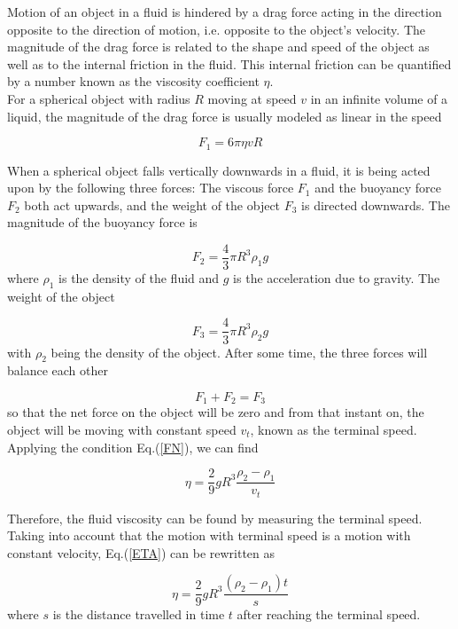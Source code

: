 \documentclass{article}
\begin{document}
Motion of an object in a fluid is hindered by a drag force acting in the direction opposite to the direction of motion, i.e. opposite to the object’s velocity. The magnitude of the drag force is related to the shape and speed of the object as well as to the internal friction in the fluid. This internal friction can be quantified by a number known as the viscosity coefficient $\eta$.
\\

For a spherical object with radius $R$ moving at speed $v$ in an infinite volume of a liquid, the magnitude of the drag force is usually modeled as linear in the speed

\begin{equation}\label{F1}
F_1=6\pi\eta vR
\end{equation}

When a spherical object falls vertically downwards in a fluid, it is being acted upon by the following three forces: The viscous force $F_1$ and the buoyancy force $F_2$ both act upwards, and the weight of the object $F_3$ is directed downwards. The magnitude of the buoyancy force is

$$F_2=\frac{4}{3}\pi R^3\rho_1g$$
where $\rho_1$ is the density of the fluid and $g$ is the acceleration due to gravity. The weight of the object

$$F_3=\frac{4}{3}\pi R^3\rho_2g$$
with $\rho_2$ being the density of the object. After some time, the three forces will balance each other

\begin{equation}\label{FN}
F_1+F_2=F_3
\end{equation}
so that the net force on the object will be zero and from that instant on, the object will be moving with constant speed $v_t$, known as the terminal speed. Applying the condition Eq.(\ref{FN}), we can find

\begin{equation}\label{ETA}
\eta=\frac{2}{9}gR^3\frac{\rho_2-\rho_1}{v_t}
\end{equation}

Therefore, the fluid viscosity can be found by measuring the terminal speed. Taking into account that the motion with terminal speed is a motion with constant velocity, Eq.(\ref{ETA}) can be rewritten as

\begin{equation}\label{ETA2}
\eta=\frac{2}{9}gR^3\frac{(\rho_2-\rho_1)t}{s}
\end{equation}
where $s$ is the distance travelled in time $t$ after reaching the terminal speed.
\\
\end{document}
